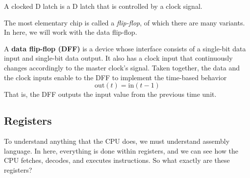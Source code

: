   \begin{figure}[H]
    \centering 
    \caption{} 
  \end{figure}

  A clocked D latch is a D latch that is controlled by a clock signal. 

  \begin{definition}
    
  \end{definition}

  The most elementary chip is called a \textit{flip-flop}, of which there are many variants. In here, we will work with the data flip-flop. 

  \begin{definition}
    A \textbf{data flip-flop (DFF)} is a device whose interface consists of a single-bit data input and single-bit data output. It also has a clock input that continuously changes accordingly to the master clock's signal. Taken together, the data and the clock inputs enable to the DFF to implement the time-based behavior 
    \begin{equation}
      \mathrm{out}(t) = \mathrm{in}(t - 1) 
    \end{equation}
    That is, the DFF outputs the input value from the previous time unit. 
  \end{definition}

  \begin{definition}[Register]
    
  \end{definition}

  \begin{definition}[Counter]
    
  \end{definition}

\subsection{Registers}

  To understand anything that the CPU does, we must understand assembly language. In here, everything is done within registers, and we can see how the CPU fetches, decodes, and executes instructions. So what exactly are these registers? 

